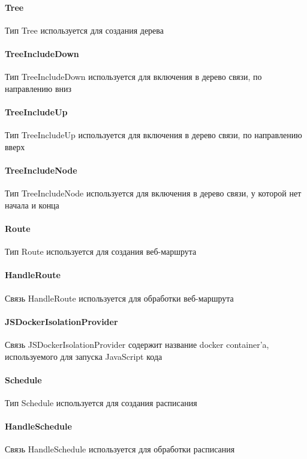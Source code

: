 \paragraph*{Tree}\hypertarget{Core.Tree.Description}{}
Тип Tree используется для создания дерева
\paragraph*{TreeIncludeDown}\hypertarget{Core.TreeIncludeDown.Description}{}
Тип TreeIncludeDown используется для
включения в дерево связи, по направлению вниз
\paragraph*{TreeIncludeUp}\hypertarget{Core.TreeIncludeUp.Description}{}
Тип TreeIncludeUp используется для включения в
дерево связи, по направлению вверх
\paragraph*{TreeIncludeNode}\hypertarget{Core.TreeIncludeNode.Description}{}
Тип TreeIncludeNode используется для
включения в дерево связи, у которой нет начала и конца
\paragraph*{Route}\hypertarget{Core.Route.Description}{}
Тип Route используется для создания веб-маршрута
\paragraph*{HandleRoute}\hypertarget{Core.HandleRoute.Description}{}
Связь HandleRoute используется для обработки
веб-маршрута
\paragraph*{JSDockerIsolationProvider}\hypertarget{Core.JSDockerIsolationProvider.Description}{}
Связь JSDockerIsolationProvider содержит название docker container'a,
используемого для запуска JavaScript кода
\paragraph*{Schedule}\hypertarget{Core.Schedule.Description}{}
Тип Schedule используется для создания расписания
\paragraph*{HandleSchedule}\hypertarget{Core.HandleSchedule.Description}{}
Связь HandleSchedule используется для обработки расписания
